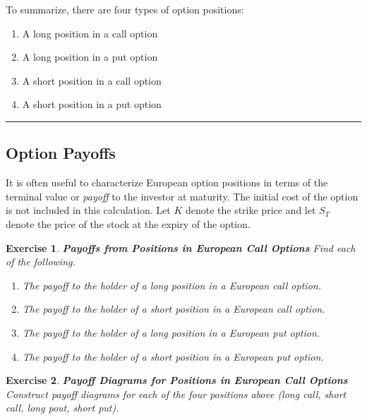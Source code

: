 \documentclass[letterpaper,10pt]{article}
\newtheorem{ex}{Exercise}
\begin{document}
To summarize, there are four types of option positions:

\begin{enumerate}

\item A long position in a call option

\item A long position in a put option

\item A short position in a call option

\item A short position in a put option

\end{enumerate}

\bigskip

\hrule

\bigskip

\subsection{Option Payoffs}

It is often useful to characterize European option positions in terms of the terminal value or {\em payoff} to the investor at maturity.  The initial cost of the option is not included in this calculation.  Let $K$ denote the strike price and let $S_T$ denote the price of the stock at the expiry of the option.  

\begin{ex}{\bf Payoffs from Positions in European Call Options}
Find each of the following.
\begin{enumerate}
\item[(a)] The payoff to the holder of a long position in a European call option.

\item[(b)] The payoff to the holder of a short position in a European call option.



\item[(c)] The payoff to the holder of a long position in a European put option.


\item[(d)] The payoff to the holder of a short position in a European put option.


\end{enumerate}
\end{ex}

\begin{ex}{\bf Payoff Diagrams for Positions in European Call Options}
Construct payoff diagrams for each of the four positions above (long call, short call, long pout, short put).
\end{ex}
\end{document}
